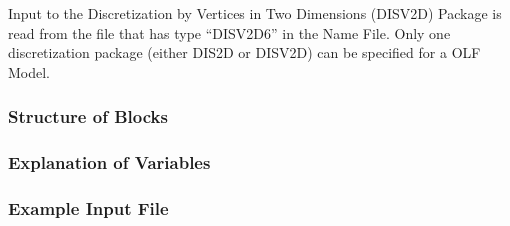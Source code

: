 Input to the Discretization by Vertices in Two Dimensions (DISV2D) Package is read from the file that has type ``DISV2D6'' in the Name File.  Only one discretization package (either DIS2D or DISV2D) can be specified for a OLF Model.

\vspace{5mm}
\subsubsection{Structure of Blocks}






\vspace{5mm}
\subsubsection{Explanation of Variables}
\begin{description}

\end{description}

\vspace{5mm}
\subsubsection{Example Input File}

